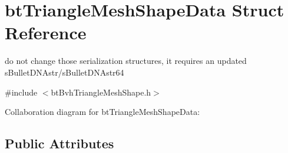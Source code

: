 \hypertarget{structbt_triangle_mesh_shape_data}{\section{bt\+Triangle\+Mesh\+Shape\+Data Struct Reference}
\label{structbt_triangle_mesh_shape_data}
}


do not change those serialization structures, it requires an updated s\+Bullet\+D\+N\+Astr/s\+Bullet\+D\+N\+Astr64  




{\ttfamily \#include $<$bt\+Bvh\+Triangle\+Mesh\+Shape.\+h$>$}



Collaboration diagram for bt\+Triangle\+Mesh\+Shape\+Data\+:
\subsection*{Public Attributes}

